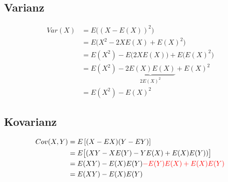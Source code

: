 \subsection{Varianz}
\label{sub:varianz}

\begin{align*}
	Var(X)&= E\bigl((X-E(X))^2\bigr)\\&
	= E\bigl(X^2 - 2XE(X) + E(X)^2\bigr)\\  &
	= E(X^2) - E\bigl(2XE(X)\bigr) + E\bigl(E(X)^2\bigr)\\&
	= E(X^2) - \underbrace{2E(X)E(X)}_{2E(X)^2} + E(X)^2\\&
	= E(X^2) - E(X)^2
\end{align*}\label{eq:versch_satz_1}

\subsection{Kovarianz}
\label{sub:kovarianz}

\begin{align*}
	Cov(X,Y) &= {E}\left[ (X-EX)(Y-EY)\right]\\
			&=  {E}\bigl[(XY - X E(Y) - Y E(X) +  E(X) E(Y))\bigr]\\
   &= {E}(XY) - {E}(X) {E}(Y) \textcolor{red}{-{E}(Y) {E}(X) + {E}(X) {E}(Y)}\\
   &=  {E}(XY) - {E}(X) {E}(Y)
\end{align*} \label{eq:versch_satz_2}

